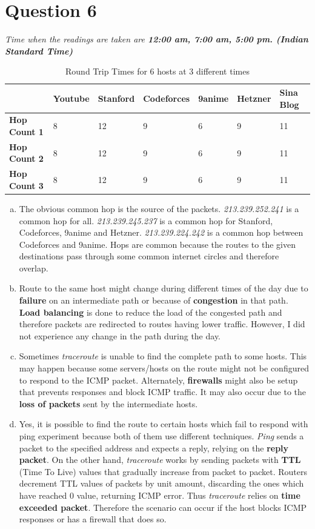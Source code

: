 \documentclass[a4paper,10pt]{article}
\begin{document}
\section*{Question 6}
\textit{Time when the readings are taken are \textbf{12:00 am, 7:00 am, 5:00 pm. (Indian Standard Time)}}
\begin{table}[h]
	\begin{tabularx}{\textwidth}{|p{100pt}||X||X||X||X||X||X|}
		\hline
		\rowcolor{cyan!40}
		  & \textbf{Youtube} & \textbf{Stanford} & \textbf{Codeforces} & \textbf{9anime} & \textbf{Hetzner} & \textbf{Sina Blog}\\ \hline
		\textbf{Hop Count 1} & 8 & 12 & 9 & 6 & 9 & 11 \\ \hline
		\textbf{Hop Count 2} & 8 & 12 & 9 & 6 & 9 & 11 \\ \hline
		\textbf{Hop Count 3} & 8 & 12 & 9 & 6 & 9 & 11 \\ \hline
	\end{tabularx}
	\caption{Round Trip Times for 6 hosts at 3 different times}
\end{table}
\begin{enumerate}[a)]
	\item The obvious common hop is the source of the packets. \textit{213.239.252.241} is a common hop for all. \textit{213.239.245.237} is a common hop for Stanford, Codeforces, 9anime and Hetzner. \textit{213.239.224.242} is a common hop between Codeforces and 9anime. Hops are common because the routes to the given destinations pass through some common internet circles and therefore overlap.
	\item Route to the same host might change during different times of the day due to \textbf{failure} on an intermediate path or because of \textbf{congestion} in that path. \textbf{Load balancing} is done to reduce the load of the congested path and therefore packets are redirected to routes having lower traffic. However, I did not experience any change in the path during the day.
	\item Sometimes \textit{traceroute} is unable to find the complete path to some hosts. This may happen because some servers/hosts on the route might not be configured to respond to the ICMP packet. Alternately, \textbf{firewalls} might also be setup that prevents responses and block ICMP traffic. It may also occur due to the \textbf{loss of packets} sent by the intermediate hosts.
	\item Yes, it is possible to find the route to certain hosts which fail to respond with ping experiment because both of them use different techniques. \textit{Ping} sends a packet to the specified address and expects a reply, relying on the \textbf{reply packet}. On the other hand, \textit{traceroute} works by sending packets with \textbf{TTL} (Time To Live) values that gradually increase from packet to packet. Routers decrement TTL values of packets by unit amount, discarding the ones which have reached 0 value, returning ICMP error. Thus \textit{traceroute} relies on \textbf{time exceeded packet}. Therefore the scenario can occur if the host blocks ICMP responses or has a firewall that does so.
\end{enumerate}
\end{document}
